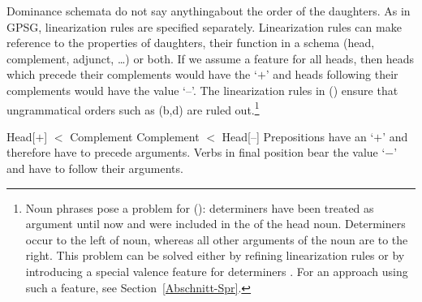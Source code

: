 Dominance schemata do not say anything\indexgpsg about the order of the daughters. As in GPSG, linearization rules are specified separately.
Linearization rules can make reference to the properties of daughters, their function in a schema (head, complement,
adjunct, \ldots) or both.
If we assume a feature \initial{} for all heads, then heads which precede their complements would have the \initialv `$+$' and heads following their
  complements would have the value `--'. The linearization rules in () ensure that ungrammatical orders such as (b,d) are
  ruled out.\footnote{%
  Noun phrases pose a problem for (): determiners have been treated as argument until now and were included in the \compsl of the
  head noun. Determiners occur to the left of noun, whereas all other arguments of the noun are to the right. This problem can be solved either
  by refining linearization rules \citep[--165]{Mueller99a} or by introducing a special valence feature for determiners
  \citep[Section~9.4]{ps2}. For an approach using such a
  feature, see Section~\ref{Abschnitt-Spr}.%
}

\eal
\ex\label{lp-ini-arg} 
Head[\initial$+$] $<$ Complement
\ex 
Complement $<$ Head[\initial --]
\zl
Prepositions have an \initialv `$+$' and therefore have to precede arguments. Verbs in final position bear the value `$-$' and have to follow
their arguments.
\eal
{}
\ex[*]{
\gll {}[[den Schrank] in]\\
     \hspaceThis{[[}the cupboard in\\
}
\zl

